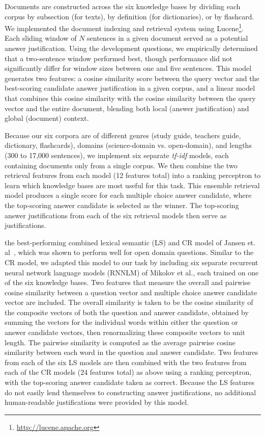 Documents are constructed across the six knowledge bases by dividing each corpus by subsection (for texts), by definition (for dictionaries), or by flashcard.  We implemented the document indexing and retrieval system using Lucene\footnote{\url{http://lucene.apache.org}}.  Each sliding window of $N$ sentences in a given document served as a potential answer justification. Using the development questions, we empirically determined that a two-sentence window performed best, though performance did not significantly differ for window sizes between one and five sentences.  This  model generates two features: a cosine similarity score between the query vector and the best-scoring candidate answer justification in a given corpus, and a linear model that combines this cosine similarity with the cosine similarity between the query vector and the entire document, blending both local (answer justification) and global (document) context. 

Because our six corpora are of different genres (study guide, teachers guide, dictionary, flashcards), domains (science-domain vs. open-domain), and lengths (300 to 17,000 sentences), we implement six separate {\em tf-idf} models, each containing documents only from a single corpus. We then combine the two retrieval features from each model (12 features total) into a ranking perceptron \cite{Shen:Joshi:2005,Surdeanu:11} to learn which knowledge bases are most useful for this task.  This ensemble retrieval model produces a single score for each multiple choice answer candidate, where the top-scoring answer candidate is selected as the winner.  The top-scoring answer justifications from each of the six retrieval models then serve as justifications. 


 
{} the best-performing combined lexical semantic (LS) and CR model of Jansen et. al~\citeyear{jansen14}, which was shown to perform well for open domain questions.  Similar to the CR model, we adapted this model to our task by including six separate recurrent neural network language models (RNNLM) of Mikolov et al.\citeyear{mikolov13,mikolov10}, each trained on one of the six knowledge bases.  Two features that measure the overall and pairwise cosine similarity between a question vector and multiple choice answer candidate vector are included.  The overall similarity is taken to be the cosine similarity of the composite vectors of both the question and answer candidate, obtained by summing the vectors for the individual words within either the question or answer candidate vectors, then renormalizing these composite vectors to unit length.  The pairwise similarity is computed as the average pairwise cosine similarity between each word in the question and answer candidate.  Two features from each of the six LS models are then combined with the two features from each of the CR models (24 features total) as above using a ranking perceptron, with the top-scoring answer candidate taken as correct.  Because the LS features do not easily lend themselves to constructing answer justifications, no additional human-readable justifications were provided by this model. 



